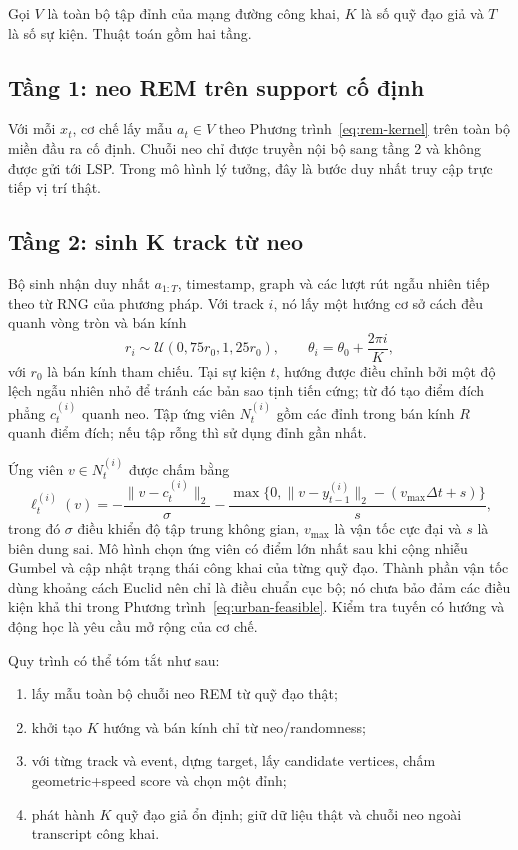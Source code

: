 \documentclass[12pt,a4paper,oneside]{report}
\begin{document}
Gọi $V$ là toàn bộ tập đỉnh của mạng đường công khai, $K$ là số quỹ đạo giả và $T$ là số sự kiện. Thuật toán gồm hai tầng.

\subsection{Tầng 1: neo REM trên support cố định}

Với mỗi $x_t$, cơ chế lấy mẫu $a_t\in V$ theo Phương trình~\ref{eq:rem-kernel} trên toàn bộ miền đầu ra cố định. Chuỗi neo chỉ được truyền nội bộ sang tầng 2 và không được gửi tới LSP. Trong mô hình lý tưởng, đây là bước duy nhất truy cập trực tiếp vị trí thật.

\subsection{Tầng 2: sinh K track từ neo}

Bộ sinh nhận duy nhất $a_{1:T}$, timestamp, graph và các lượt rút ngẫu nhiên tiếp theo từ RNG của phương pháp. Với track $i$, nó lấy một hướng cơ sở cách đều quanh vòng tròn và bán kính
\[
r_i\sim\mathcal U(0{,}75r_0,1{,}25r_0),
\qquad \theta_i=\theta_0+\frac{2\pi i}{K},
\]
với $r_0$ là bán kính tham chiếu. Tại sự kiện $t$, hướng được điều chỉnh bởi một độ lệch ngẫu nhiên nhỏ để tránh các bản sao tịnh tiến cứng; từ đó tạo điểm đích phẳng $c_t^{(i)}$ quanh neo. Tập ứng viên $N_t^{(i)}$ gồm các đỉnh trong bán kính $R$ quanh điểm đích; nếu tập rỗng thì sử dụng đỉnh gần nhất.

Ứng viên $v\in N_t^{(i)}$ được chấm bằng
\[
\ell_t^{(i)}(v)
=-\frac{\|v-c_t^{(i)}\|_2}{\sigma}
-\frac{\max\{0,\|v-y_{t-1}^{(i)}\|_2-(v_{\max}\Delta t+s)\}}{s},
\]
trong đó $\sigma$ điều khiển độ tập trung không gian, $v_{\max}$ là vận tốc cực đại và $s$ là biên dung sai. Mô hình chọn ứng viên có điểm lớn nhất sau khi cộng nhiễu Gumbel và cập nhật trạng thái công khai của từng quỹ đạo. Thành phần vận tốc dùng khoảng cách Euclid nên chỉ là điều chuẩn cục bộ; nó chưa bảo đảm các điều kiện khả thi trong Phương trình~\ref{eq:urban-feasible}. Kiểm tra tuyến có hướng và động học là yêu cầu mở rộng của cơ chế.

Quy trình có thể tóm tắt như sau:

\begin{enumerate}
  \item lấy mẫu toàn bộ chuỗi neo REM từ quỹ đạo thật;
  \item khởi tạo $K$ hướng và bán kính chỉ từ neo/randomness;
  \item với từng track và event, dựng target, lấy candidate vertices, chấm geometric+speed score và chọn một đỉnh;
  \item phát hành $K$ quỹ đạo giả ổn định; giữ dữ liệu thật và chuỗi neo ngoài transcript công khai.
\end{enumerate}
\end{document}
